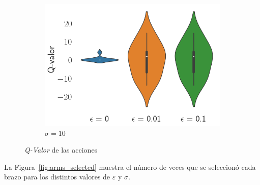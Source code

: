 \documentclass[12pt]{article}
\begin{document}
\begin{figure}[H]
\begin{subfigure}[H]{0.3\textwidth}
            \includegraphics[width=\textwidth]{../img/values_sigma_10}
            \caption{$\sigma=10$}
            \label{fig:estimations_2}
        \end{subfigure}

        \caption{\textit{Q-Valor} de las acciones}
        \label{fig:estimations}
    \end{figure}

    La Figura~\ref{fig:arms_selected} muestra el número de veces que se seleccionó cada brazo para los distintos valores de $\varepsilon$ y $\sigma$.
\end{document}
